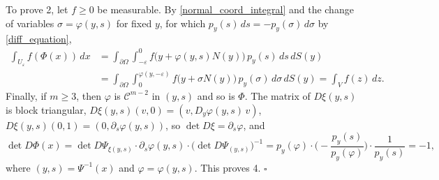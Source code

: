 \documentclass[10pt,a4paper]{amsart}
\theoremstyle{plain}
\newcommand{\eproof}{\hfill \mbox{${\square}$}}
\begin{document}
{To prove 2, let $f \geq 0$ be measurable. By \eqref{normal_coord_integral} and the change of variables $\sigma = \varphi(y,s)$ for fixed $y$, for which $p_y(s)\,ds = -p_y(\sigma)\,d\sigma$ by \eqref{diff_equation},
\begin{align*}
\int_{U_\varepsilon} f(\Phi(x))\, dx
 & = \int_{\partial\Omega}\int_{-\varepsilon}^{0} f\big(y + \varphi(y,s)N(y)\big)\, p_y(s)\, ds\, dS(y) \\
 & = \int_{\partial\Omega}\int_{0}^{\varphi(y,-\varepsilon)} f\big(y + \sigma N(y)\big)\, p_y(\sigma)\, d\sigma\, dS(y)
 = \int_V f(z)\, dz .
\end{align*}
Finally, if $m \geq 3$, then $\varphi$ is $\mathcal{C}^{m-2}$ in $(y,s)$ and so is $\Phi$. The matrix of $D\xi(y,s)$ is block triangular,
$D\xi(y,s)(v,0) = (v, D_y\varphi(y,s)\,v)$, $D\xi(y,s)(0,1) = (0, \partial_s\varphi(y,s))$, so $\det D\xi = \partial_s\varphi$, and
\[
 \det D\Phi(x) = \det D\Psi_{\xi(y,s)}\cdot \partial_s\varphi(y,s)\cdot \big(\det D\Psi_{(y,s)}\big)^{-1}
 = p_y(\varphi)\cdot\Big(-\frac{p_y(s)}{p_y(\varphi)}\Big)\cdot \frac{1}{p_y(s)} = -1,
\]
where $(y,s) = \Psi^{-1}(x)$ and $\varphi = \varphi(y,s)$. This proves 4.}
  \eproof
\end{document}
